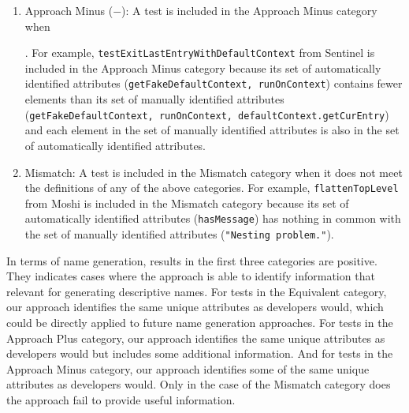 \begin{enumerate}
    \item Approach Minus ($\boldsymbol{-}$): A test is included in the Approach Minus category when
    .
    For example, \texttt{test\-Exit\-Last\-Entry\-With\-Default\-Context} from Sentinel is included in the Approach Minus category because its set of automatically identified attributes (\texttt{get\-Fake\-Default\-Context, run\-On\-Context}) contains fewer elements than its set of manually identified attributes (\texttt{get\-Fake\-Default\-Context, run\-On\-Context, default\-Con\-text.get\-Cur\-Entry}) and each element in the set of manually identified attributes is also in the set of automatically identified attributes.    

    \item Mismatch: A test is included in the Mismatch category when it does not meet the definitions of any of the above categories. 
    For example, \texttt{flatten\-Top\-Level} from Moshi is included in the Mismatch category because its set of automatically identified attributes (\texttt{has\-Message}) has nothing in common with the set of manually identified attributes (\texttt{"Nesting~problem."}).
\end{enumerate}


In terms of name generation, results in the first three categories are positive.
%
They indicates cases where the approach is able to identify information that relevant for generating descriptive names.
%
For tests in the Equivalent category, our approach identifies the same unique attributes as developers would, which could be directly applied to future name generation approaches.
%
For tests in the Approach Plus category, our approach identifies the same unique attributes as developers would but includes some additional information.
%
And for tests in the Approach Minus category, our approach identifies some of the same unique attributes as developers would.
%
Only in the case of the Mismatch category does the approach fail to provide useful information.


